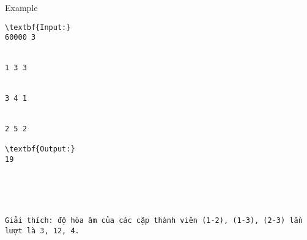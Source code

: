 Example
\begin{verbatim}
\textbf{Input:}
60000 3


1 3 3


3 4 1


2 5 2

\textbf{Output:}
19





Giải thích: độ hòa âm của các cặp thành viên (1-2), (1-3), (2-3) lần lượt là 3, 12, 4. \end{verbatim}